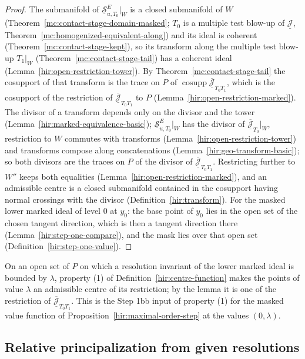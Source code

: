 \begin{proof}
\leanok
The submanifold of \(\underline{\mathcal S}^E_{u,T_0}|_W\) is a closed submanifold of \(W\) (Theorem~\ref{mc:contact-stage-domain-masked}; \(T_0\) is a multiple test blow-up of
\(\underline{\mathcal J}\), Theorem~\ref{mc:homogenized-equivalent-along}) and its ideal is coherent (Theorem~\ref{mc:contact-stage-kept}), so its transform along the multiple test
blow-up \(T_1|_W\) (Theorem~\ref{mc:contact-stage-tail}) has a coherent ideal (Lemma~\ref{hir:open-restriction-tower}). By Theorem~\ref{mc:contact-stage-tail} the cosupport of that
transform is the trace on \(P\) of \(\operatorname{cosupp}\overline{\underline{\mathcal J}}_{T_0T_1}\), which is the cosupport of the restriction of
\(\overline{\underline{\mathcal J}}_{T_0T_1}\) to \(P\) (Lemma~\ref{hir:open-restriction-marked}). The divisor of a transform depends only on the divisor and the tower
(Lemma~\ref{hir:marked-equivalence-basic}); \(\underline{\mathcal S}^E_{u,T_0}|_W\) has the divisor of \(\overline{\underline{\mathcal J}}_{T_0}|_W\), restriction to \(W\)
commutes with transforms (Lemma~\ref{hir:open-restriction-tower}) and transforms compose along concatenations (Lemma~\ref{hir:geo-transform-basic}); so both divisors are the traces
on \(P\) of the divisor of \(\overline{\underline{\mathcal J}}_{T_0T_1}\). Restricting further to \(W''\) keeps both equalities (Lemma~\ref{hir:open-restriction-marked}), and an
admissible centre is a closed submanifold contained in the cosupport having normal crossings with the divisor (Definition~\ref{hir:transform}). For the masked lower marked ideal
of level \(0\) at \(y_0\): the base point of \(y_0\) lies in the open set of the chosen tangent direction, which is then a tangent direction there
(Lemma~\ref{hir:step-one-compare}), and the mask lies over that open set (Definition~\ref{hir:step-one-value}).
\end{proof}
On an open set of \(P\) on which a resolution invariant of the lower marked ideal is bounded by \(\lambda\), property (1) of Definition~\ref{hir:centre-function} makes the points of
value \(\lambda\) an admissible centre of its restriction; by the lemma it is one of the restriction of \(\overline{\underline{\mathcal J}}_{T_0T_1}\). This is the Step 1bb input of
property (1) for the masked value function of Proposition~\ref{hir:maximal-order-step} at the values \((0,\lambda)\).

\subsection{Relative principalization from given resolutions}

